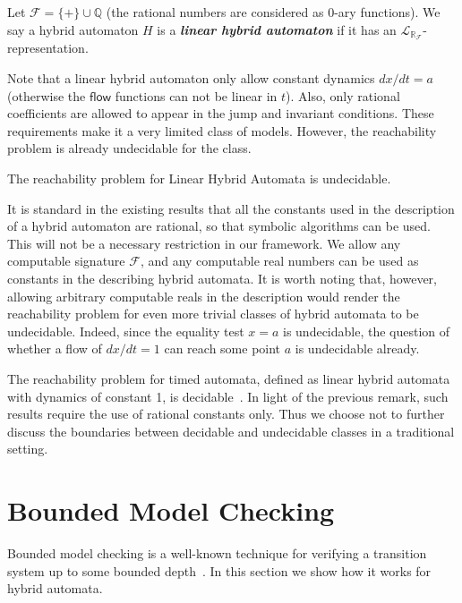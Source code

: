 \documentclass[envcountsect]{llncs}
\newcommand{\flow}{\mathsf{flow}}
\newcommand{\lrf}{\mathcal{L}_{\mathbb{R}_{\mathcal{F}}}}
\begin{document}
\begin{definition}
Let $\mathcal{F} = \{+\}\cup \mathbb{Q}$ (the rational numbers are considered as 0-ary functions). We say a hybrid automaton $H$ is a {\bf\em linear hybrid automaton} if it has an $\lrf$-representation. 
\end{definition}

Note that a linear hybrid automaton only allow constant dynamics $dx/dt = a$ (otherwise the $\flow$ functions can not be linear in $t$). Also, only rational coefficients are allowed to appear in the jump and invariant conditions. These requirements make it a very limited class of models. However, the reachability problem is already undecidable for the class. 

\begin{proposition}
The reachability problem for Linear Hybrid Automata is undecidable. 
\end{proposition}

It is standard in the existing results that all the constants used in the description of a hybrid automaton are rational, so that symbolic algorithms can be used. This will not be a necessary restriction in our framework. We allow any computable signature $\mathcal{F}$, and any computable real numbers can be used as constants in the describing hybrid automata. It is worth noting that, however, allowing arbitrary computable reals in the description would render the reachability problem for even more trivial classes of hybrid automata to be undecidable. Indeed, since the equality test $x=a$ is undecidable, the question of whether a flow of $dx/dt = 1$ can reach some point $a$ is undecidable already.

\begin{remark}
The reachability problem for timed automata, defined as linear hybrid automata with dynamics of constant 1, is decidable~\cite{DBLP:conf/rex/AlurD91}. In light of the previous remark, such results require the use of rational constants only. Thus we choose not to further discuss the boundaries between decidable and undecidable classes in a traditional setting. 
\end{remark}

\section{Bounded Model Checking}


Bounded model checking is a well-known technique for verifying a transition system up to some bounded depth~\cite{DBLP:journals/fmsd/ClarkeBRZ01}. In this section we show how it works for hybrid automata. 
\end{document}
